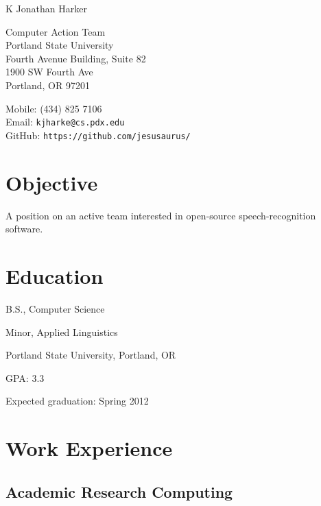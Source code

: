 \documentclass[10pt,letterpaper]{article}
\def\name{K Jonathan Harker}
\renewenvironment{itemize}{
  \begin{list}{}{
    \setlength{\leftmargin}{1.5em}
    \setlength{\itemsep}{0em}
    \setlength{\parskip}{0pt}
    \setlength{\parsep}{0em}
  }
}{
  \end{list}
}
\begin{document}
{\huge \name}


\vspace{0.25in}

\begin{minipage}[t]{0.5\textwidth}
  Computer Action Team \\
  Portland State University \\
  Fourth Avenue Building, Suite 82 \\
  1900 SW Fourth Ave \\
  Portland, OR 97201
\end{minipage}
\begin{minipage}[t]{0.5\textwidth}
  Mobile: (434) 825 7106\\
  Email: \texttt{kjharke@cs.pdx.edu} \\
  GitHub: \texttt{https://github.com/jesusaurus/} \\
\end{minipage}

\section*{Objective}

A position on an active team interested in open-source speech-recognition software.

\section*{Education}

\begin{itemize}

  \item B.S., Computer Science
  \item Minor, Applied Linguistics
  \item Portland State University, Portland, OR
  \item GPA: 3.3
  \item Expected graduation: Spring 2012
  
\end{itemize}

\section*{Work Experience}

\subsection*{Academic Research Computing}
\end{document}
